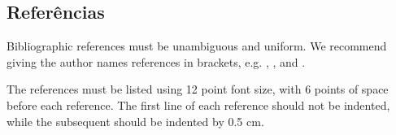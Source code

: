 \documentclass[12pt]{article}
\begin{document}
\begin{flushleft}




\section{Referências}

Bibliographic references must be unambiguous and uniform.  We recommend giving
the author names references in brackets, e.g. \cite{knuth:84},
\cite{boulic:91}, and \cite{smith:99}.

The references must be listed using 12 point font size, with 6 points of space
before each reference. The first line of each reference should not be
indented, while the subsequent should be indented by 0.5 cm.




\end{flushleft}
\end{document}
